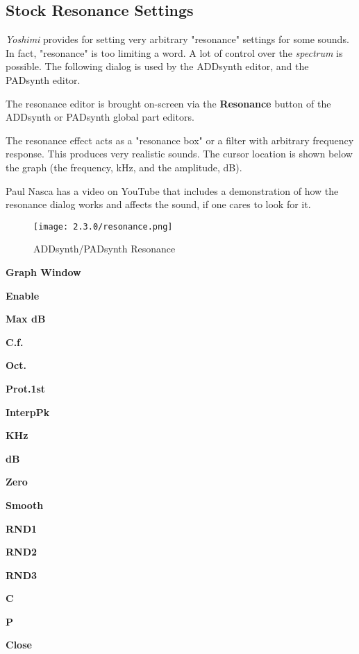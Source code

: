 \subsection{Stock Resonance Settings}
\label{subsec:stock_resonance_settings}

   \textsl{Yoshimi} provides for setting very arbitrary "resonance"
   settings for some sounds.  In fact, "resonance" is too limiting a word.
   A lot of control over the \textsl{spectrum} is possible.
   The following dialog is used by
   the ADDsynth editor, and the PADsynth editor.

   The resonance editor is brought on-screen via the
   \textbf{Resonance} button of the ADDsynth or PADsynth
   global part editors.

   The resonance effect acts as a "resonance box" or a filter with arbitrary
   frequency response. This produces very realistic sounds.
   The cursor location is shown below the graph (the frequency, kHz, and
   the amplitude, dB).

   Paul Nasca has a video on YouTube that includes a demonstration of how
   the resonance dialog works and affects the sound, if one cares to look for
   it.

\begin{figure}[H]
   \centering
   \texttt{[image: 2.3.0/resonance.png]}
   \caption{ADDsynth/PADsynth Resonance}
   \label{fig:addsynth_resonance}
\end{figure}

   \begin{enumber}
      \item \textbf{Graph Window}
      \item \textbf{Enable}
      \item \textbf{Max dB}
      \item \textbf{C.f.}
      \item \textbf{Oct.}
      \item \textbf{Prot.1st}
      \item \textbf{InterpPk}
      \item \textbf{KHz}
      \item \textbf{dB}
      \item \textbf{Zero}
      \item \textbf{Smooth}
      \item \textbf{RND1}
      \item \textbf{RND2}
      \item \textbf{RND3}
      \item \textbf{C}
      \item \textbf{P}
      \item \textbf{Close}
   \end{enumber}

